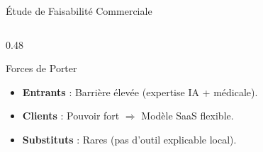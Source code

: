 \documentclass{beamer}
\begin{document}
\begin{frame}[t]{Étude de Faisabilité Commerciale}
\begin{columns}[T,onlytextwidth]
\begin{column}{0.48\textwidth}
\vspace{-0.2em}

\begin{block}{Forces de Porter}
\begin{itemize}
\setlength{\itemsep}{0.02em}
\item \textbf{Entrants} : Barrière élevée (expertise IA + médicale).
\item \textbf{Clients} : Pouvoir fort $\Rightarrow$ Modèle SaaS flexible.
\item \textbf{Substituts} : Rares (pas d'outil explicable local).
\end{itemize}
\end{block}
\end{column}
\end{columns}

\end{frame}
\end{document}
